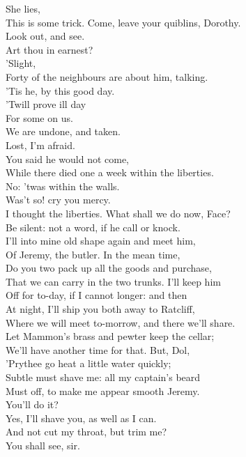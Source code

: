 \documentclass[a4paper,oneside]{memoir}
\begin{document}
\begin{drama*}
\facespeaks {} She lies,\\
This is some trick. Come, leave your quiblins, Dorothy.\\
\dolspeaks Look out, and see.\\
\subtlespeaks {} Art thou in earnest?\\
\dolspeaks {} 'Slight,\\
Forty of the neighbours are about him, talking.\\
\facespeaks 'Tis he, by this good day.\\
\dolspeaks {} 'Twill prove ill day\\
For some on us.\\
\facespeaks {} We are undone, and taken.\\
\dolspeaks Lost, I'm afraid.\\
\subtlespeaks {} You said he would not come,\\
While there died one a week within the liberties.\\
\facespeaks No: 'twas within the walls.\\
\subtlespeaks {} Was't so! cry you mercy.\\
I thought the liberties. What shall we do now, Face?\\
\facespeaks Be silent: not a word, if he call or knock.\\
I'll into mine old shape again and meet him,\\
Of Jeremy, the butler. In the mean time,\\
Do you two pack up all the goods and purchase,\\
That we can carry in the two trunks. I'll keep him\\
Off for to-day, if I cannot longer: and then\\
At night, I'll ship you both away to Ratcliff,\\
Where we will meet to-morrow, and there we'll share.\\
Let Mammon's brass and pewter keep the cellar;\\
We'll have another time for that. But, Dol,\\
'Prythee go heat a little water quickly;\\
Subtle must shave me: all my captain's beard\\
Must off, to make me appear smooth Jeremy.\\
You'll do it?\\
\subtlespeaks {} Yes, I'll shave you, as well as I can.\\
\facespeaks And not cut my throat, but trim me?\\
\subtlespeaks {} You shall see, sir.\\
\act


\end{drama*}
\end{document}
